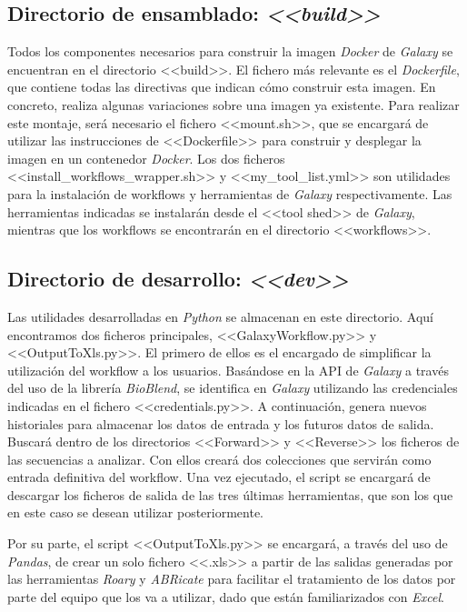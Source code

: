\subsection{Directorio de ensamblado: \textit{<<build>>}}
Todos los componentes necesarios para construir la imagen \textit{Docker} de \textit{Galaxy} se encuentran en el directorio <<build>>. El fichero más relevante es el \textit{Dockerfile}, que contiene todas las directivas que indican cómo construir esta imagen. En concreto, realiza algunas variaciones sobre una imagen ya existente. Para realizar este montaje, será necesario el fichero <<mount.sh>>, que se encargará de utilizar las instrucciones de <<Dockerfile>> para construir y desplegar la imagen en un contenedor \textit{Docker}. Los dos ficheros <<install\_workflows\_wrapper.sh>> y <<my\_tool\_list.yml>> son utilidades para la instalación de workflows y herramientas de \textit{Galaxy} respectivamente. Las herramientas indicadas se instalarán desde el <<tool shed>> de \textit{Galaxy}, mientras que los workflows se encontrarán en el directorio <<workflows>>.

\subsection{Directorio de desarrollo: \textit{<<dev>>}}
Las utilidades desarrolladas en \textit{Python} se almacenan en este directorio. Aquí encontramos dos ficheros principales, <<GalaxyWorkflow.py>> y <<OutputToXls.py>>. El primero de ellos es el encargado de simplificar la utilización del workflow a los usuarios. Basándose en la API de \textit{Galaxy} a través del uso de la librería \textit{BioBlend}, se identifica en \textit{Galaxy} utilizando las credenciales indicadas en el fichero <<credentials.py>>. A continuación, genera nuevos historiales para almacenar los datos de entrada y los futuros datos de salida. Buscará dentro de los directorios <<Forward>> y <<Reverse>> los ficheros de las secuencias a analizar. Con ellos creará dos colecciones que servirán como entrada definitiva del workflow. Una vez ejecutado, el script se encargará de descargar los ficheros de salida de las tres últimas herramientas, que son los que en este caso se desean utilizar posteriormente.

Por su parte, el script <<OutputToXls.py>> se encargará, a través del uso de \textit{Pandas}, de crear un solo fichero <<.xls>> a partir de las salidas generadas por las herramientas \textit{Roary} y \textit{ABRicate} para facilitar el tratamiento de los datos por parte del equipo que los va a utilizar, dado que están familiarizados con \textit{Excel}.

